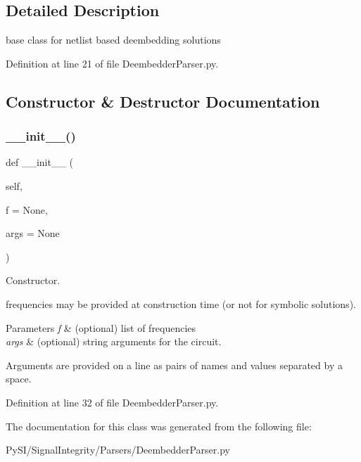 \subsection{Detailed Description}
base class for netlist based deembedding solutions 

Definition at line 21 of file Deembedder\+Parser.\+py.



\subsection{Constructor \& Destructor Documentation}
\mbox{\label{classSignalIntegrity_1_1Parsers_1_1DeembedderParser_1_1DeembedderParser_af9856388f7022892c3159ad55872a27e}} 
\subsubsection{\texorpdfstring{\+\_\+\+\_\+init\+\_\+\+\_\+()}{\_\_init\_\_()}}
{\footnotesize\ttfamily def \+\_\+\+\_\+init\+\_\+\+\_\+ (\begin{DoxyParamCaption}\item[{}]{self,  }\item[{}]{f = {\ttfamily None},  }\item[{}]{args = {\ttfamily None} }\end{DoxyParamCaption})}



Constructor. 

frequencies may be provided at construction time (or not for symbolic solutions).


\begin{DoxyParams}{Parameters}
{\em f} & (optional) list of frequencies \\
\hline
{\em args} & (optional) string arguments for the circuit.\\
\hline
\end{DoxyParams}
Arguments are provided on a line as pairs of names and values separated by a space. 

Definition at line 32 of file Deembedder\+Parser.\+py.



The documentation for this class was generated from the following file\+:\begin{DoxyCompactItemize}
\item 
Py\+S\+I/\+Signal\+Integrity/\+Parsers/Deembedder\+Parser.\+py\end{DoxyCompactItemize}
